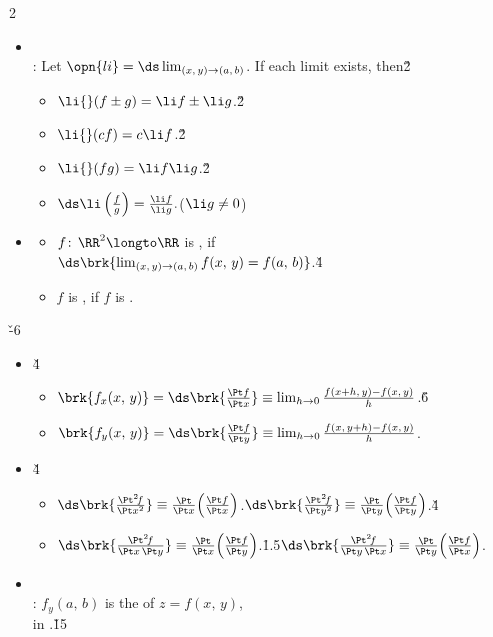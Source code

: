 \documentclass[dvipdfmx,a4paper,titlepage,9pt]{jsarticle}
\begin{document}
\begin{multicols*}{2}
\begin{itemize}[label={-}]
\item{}\\
: Let $\opn{li}=\ds\lim_{(x,\,y)\to(a,\,b)}$. If each limit exists, then\v2
\begin{itemize}[label=\Cdot]
\setlength{\leftskip}{-5pt}
\item $\li{}(f\pm g)=\li f\pm\li g$.\v2
\item $\li{}(cf)=c\li f$.\v2
\item $\li{}(fg)=\li f\li g$.\v2
\item $\ds\li\left(\frac fg\right)=\frac{\li f}{\li g}.$\quad($\li g\neq0$)\\
\end{itemize}

\item{}
\begin{itemize}[label=\Cdot]
\setlength{\leftskip}{-10pt}
\item $f\!:\,\RR^2\longto\RR$ is , if\\
$\ds\brk{\lim_{(x,\,y)\to(a,\,b)}f(x,\,y)=f(a,\,b)}$.\v4
\item $f$ is , \;if $f$ is .
\end{itemize}
\end{itemize}

\vfill\null\columnbreak

\v{-6}
\begin{itemize}[label={-}]
\item{}\v4
\begin{itemize}[label=\Cdot]
\setlength{\leftskip}{-10pt}
\item $\brk{f_x(x,\,y)}=\ds\brk{\frac{\Pt f}{\Pt x}}\equiv\lim_{h\to0}\frac{f(x+h,\,y)-f(x,\,y)}h$.\v6
\item $\brk{f_y(x,\,y)}=\ds\brk{\frac{\Pt f}{\Pt y}}\equiv\lim_{h\to0}\frac{f(x,\,y+h)-f(x,\,y)}h$.\\
\end{itemize}
\item{}\v4
\begin{itemize}[label=\Cdot]
\setlength{\leftskip}{-10pt}
\item $\ds\brk{\frac{\Pt^2\!f}{\Pt x^2}}\equiv\frac{\Pt}{\Pt x}\!\left(\frac{\Pt f}{\Pt x}\right)$.\qquad\quad\Cdot\;\;$\ds\brk{\frac{\Pt^2\!f}{\Pt y^2}}\equiv\frac{\Pt}{\Pt y}\!\left(\frac{\Pt f}{\Pt y}\right)$.\v4
\item $\ds\brk{\frac{\Pt^2\!f}{\Pt x\,\Pt y}}\equiv\frac{\Pt}{\Pt x}\!\left(\frac{\Pt f}{\Pt y}\right)$.\qquad\h{1.5}\Cdot\;\;$\ds\brk{\frac{\Pt^2\!f}{\Pt y\,\Pt x}}\equiv\frac{\Pt}{\Pt y}\!\left(\frac{\Pt f}{\Pt x}\right)$.\\
\end{itemize}
\item{}\\
: $f_y(a,\,b)$ is the  of $z=f(x,\,y)$,\\
\;\;in .\v{15}


\end{itemize}
\end{multicols*}
\end{document}
